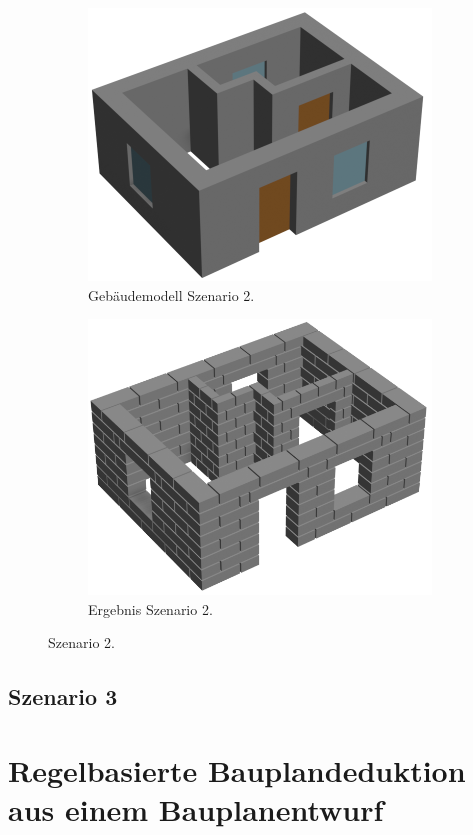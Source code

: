 \begin{figure}[htb]
  \begin{subfigure}[b]{0.5\columnwidth}
    \includegraphics[width=\columnwidth]{fig/scenario2_rendering_input.png}
    \caption{Gebäudemodell Szenario 2.}\label{fig:poc:scenario2 modell}
  \end{subfigure}
  \hfill
  \begin{subfigure}[b]{0.5\columnwidth}
    \includegraphics[width=\columnwidth]{fig/scenario2_render.png}
    \caption{Ergebnis Szenario 2.}\label{fig:poc:scenario2 ergebnis}
  \end{subfigure}
\caption{Szenario 2.}\label{fig:poc:result_scenario2}
\end{figure}

\subsection{Szenario 3}\label{poc:scenario3}
\section{Regelbasierte Bauplandeduktion aus einem Bauplanentwurf}